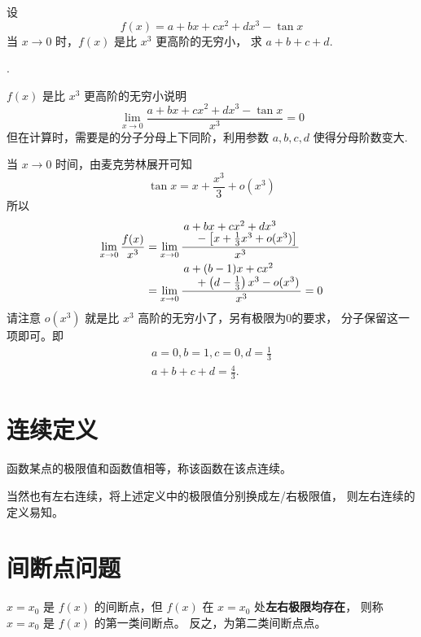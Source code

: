 \begin{example}
    设
    \[
        f(x) =  a+ bx + c x^2 + dx^3 - \tan x
    \]
    当 $x \to 0$ 时，$f(x)$ 是比 $x^3$ 更高阶的无穷小，
    求 $a+b+c+d$.

    \cite[page 2, qesution 7]{ll}.

    $f(x)$ 是比 $x^3$ 更高阶的无穷小说明
    \[
        \lim_{x \to 0} \frac{a+ bx + c x^2 + dx^3 - \tan x}{x^3} = 0
    \]
    但在计算时，需要是的分子分母上下同阶，利用参数 $a, b, c, d$
    使得分母阶数变大.

    当 $x \to 0$ 时间，由麦克劳林展开可知
    \[
        \tan x = x + \frac{x^3}{3} + o(x^3)
    \]
    所以
    \begin{align*}
        \lim_{ x \to 0 } \frac{f(x)}{x^3} 
        &= \lim_{x \to 0} \frac{\splitfrac{a + bx + cx^2 + dx^3}{ - \left[x + \frac{1}{3} x^3 + o(x^3) \right]}}{x^3} \\
        &= \lim_{x \to 0} \frac{\splitfrac{a + (b - 1) x + cx^2}{ + \left(d - \frac{1}{3}\right)x^3 - o(x^3)}}{x^3} = 0
    \end{align*}
    请注意 $o(x^3)$ 就是比 $x^3$ 高阶的无穷小了，另有极限为0的要求，
    分子保留这一项即可。即
    \begin{gather*}
        a = 0, b = 1, c = 0, d = \frac{1}{3} \\
        a + b + c + d = \frac{4}{3}.
    \end{gather*}
\end{example}

\section{连续定义}

\begin{definition}
	函数某点的极限值和函数值相等，称该函数在该点连续。
\end{definition}
当然也有左右连续，将上述定义中的极限值分别换成左/右极限值，
则左右连续的定义易知。

\section{间断点问题}

\begin{definition}[第一/二类间断点]
    \label{def:discontinunities-chinese-version}
    $x = x_0$ 是 $f(x)$ 的间断点，但 $f(x)$ 在 $x = x_0$ 处\textbf{左右极限均存在}，
    则称 $x = x_0$ 是 $f(x)$ 的第一类间断点。
    反之，为第二类间断点点。
\end{definition}

